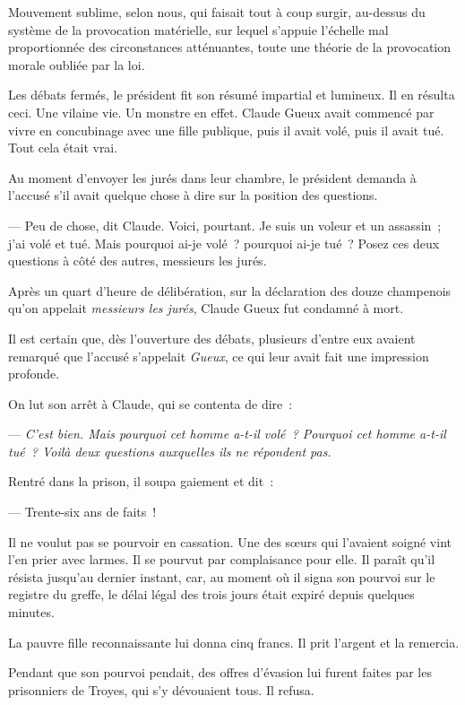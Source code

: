 \documentclass[french,twoside]{book} %
\begin{document}
 Mouvement sublime, selon nous, qui faisait tout à coup surgir, au-dessus du système de la provocation matérielle, sur lequel s’appuie l’échelle mal proportionnée des circonstances atténuantes, toute une théorie de la provocation morale oubliée par la loi.\par
Les débats fermés, le président fit son résumé impartial et lumineux. Il en résulta ceci. Une vilaine vie. Un monstre en effet. Claude Gueux avait commencé par vivre en concubinage avec une fille publique, puis il avait volé, puis il avait tué. Tout cela était vrai.\par
Au moment d’envoyer les jurés dans leur chambre, le président demanda à l’accusé s’il avait quelque chose à dire sur la position des questions.\par
— Peu de chose, dit Claude. Voici, pourtant. Je suis un voleur et un assassin ; j’ai volé et tué. Mais pourquoi ai-je volé ? pourquoi ai-je tué ? Posez ces deux questions à côté des autres, messieurs les jurés.\par
Après un quart d’heure de délibération, sur la déclaration des douze champenois qu’on appelait \emph{messieurs les jurés}, Claude Gueux fut condamné à mort.\par
Il est certain que, dès l’ouverture des débats, plusieurs d’entre eux avaient remarqué que l’accusé s’appelait \emph{Gueux}, ce qui leur avait fait une impression profonde.\par
On lut son arrêt à Claude, qui se contenta de dire :\par
— \emph{C’est bien. Mais pourquoi cet homme a-t-il volé ? Pourquoi cet homme a-t-il tué ? Voilà deux questions auxquelles ils ne répondent pas.}\par
 Rentré dans la prison, il soupa gaiement et dit :\par
— Trente-six ans de faits !\par
Il ne voulut pas se pourvoir en cassation. Une des sœurs qui l’avaient soigné vint l’en prier avec larmes. Il se pourvut par complaisance pour elle. Il paraît qu’il résista jusqu’au dernier instant, car, au moment où il signa son pourvoi sur le registre du greffe, le délai légal des trois jours était expiré depuis quelques minutes.\par
La pauvre fille reconnaissante lui donna cinq francs. Il prit l’argent et la remercia.\par
Pendant que son pourvoi pendait, des offres d’évasion lui furent faites par les prisonniers de Troyes, qui s’y dévouaient tous. Il refusa.\par
\end{document}
